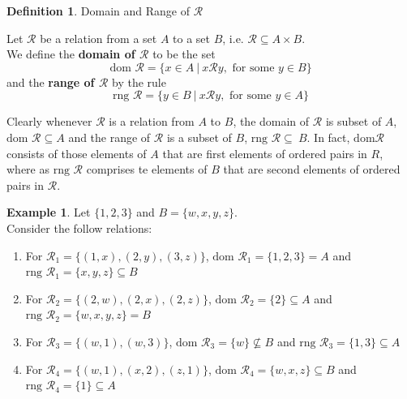 \documentclass{book}
\theoremstyle{definition}
\newtheorem{definition}{Definition}[section]
\newtheorem{example}{Example}[definition]
\theoremstyle{remark}
\newcommand{\cc}[1]{\mathcal{#1}}
\begin{document}
    \begin{definition} 
        Domain and Range of $\cc{R}$ \\
        
        \begin{tcolorbox}      
            Let $\cc{R}$ be a relation from a set $A$ to a set $B$, i.e. $\cc{R} \subseteq A \times B$. \\
            We define the \textbf{domain of $\cc{R}$} to be the set 
                \begin{equation*}
                    \text{dom } \cc{R} = \{ x \in A \:|\: x \cc{R} y, \text{ for some } y \in B \}
                \end{equation*}
            and the \textbf{range of $\cc{R}$} by the rule 
                \begin{equation*}
                    \text{rng } \cc{R} = \{ y \in B \:|\: x \cc{R} y, \text{ for some } y \in A \}
                \end{equation*}
        \end{tcolorbox}
    \end{definition}

    
    Clearly whenever $\cc{R}$ is a relation from $A$ to $B$, the domain of $\cc{R}$ is subset of $A$, $\text{dom } \cc{R} \subseteq A$ and the range of $\cc{R}$ is a subset of $B$, $\text{rng } \cc{R} \subseteq\ B$. In fact, $\text{dom} \cc{R}$ consists of those elements of $A$ that are first elements of ordered pairs in $R$, where as $\text{rng } \cc{R}$ comprises te elements of $B$ that are second elements of ordered pairs in $\cc{R}$. 

    \begin{example}
        Let $\{ 1,2,3 \}$ and $B = \{w,x,y,z \}$. \\
        
        Consider the follow relations: 
            \begin{enumerate}
                \item For $\cc{R}_1 = \{ (1,x), (2,y), (3,z) \}$, $\text{dom } \cc{R}_1 = \{1, 2, 3 \} = A$ and $\text{rng } \cc{R}_1 = \{x, y, z \} \subseteq B$
                
                \item For $\cc{R}_2 = \{ (2,w), (2,x), (2,z) \}$, $\text{dom } \cc{R}_2 = \{2 \} \subseteq A$ and $\text{rng } \cc{R}_2 = \{w, x, y, z \} = B$
                
                \item For $\cc{R}_3 = \{ (w,1), (w,3) \}$, $\text{dom } \cc{R}_3 = \{w \} \nsubseteq B$ and $\text{rng } \cc{R}_3 = \{1, 3 \} \subseteq A$ 
                
                \item For $\cc{R}_4 = \{ (w,1), (x,2), (z,1) \}$, $\text{dom } \cc{R}_4 = \{w, x, z \} \subseteq B$ and $\text{rng } \cc{R}_4 = \{1 \} \subseteq A$
            \end{enumerate}
                
    \end{example}
\end{document}

